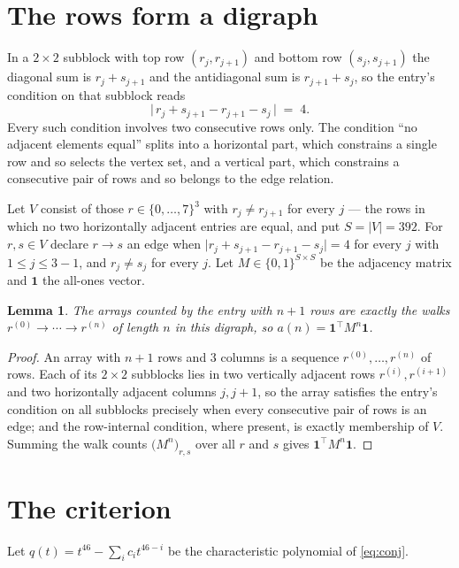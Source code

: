 \documentclass[11pt,a4paper]{article}
\theoremstyle{plain}
\newtheorem{lemma}[theorem]{Lemma}
\theoremstyle{definition}
\begin{document}
\section{The rows form a digraph}

In a $2\times2$ subblock with top row $(r_j,r_{j+1})$ and bottom row $(s_j,s_{j+1})$ the
diagonal sum is $r_j+s_{j+1}$ and the antidiagonal sum is $r_{j+1}+s_j$, so the entry's
condition on that subblock reads
\[
\bigl|\,r_j+s_{j+1}-r_{j+1}-s_j\,\bigr|\;=\;4.
\]
Every such condition involves two consecutive rows only. The condition ``no adjacent elements equal'' splits into a horizontal
part, which constrains a single row and so selects the vertex set, and a vertical part,
which constrains a consecutive pair of rows and so belongs to the edge relation.

Let $V$ consist of those $r\in\{0,\dots,7\}^{3}$ with $r_j\ne r_{j+1}$ for every
$j$ --- the rows in which no two horizontally adjacent entries are equal, and put $S=|V|=392$. For $r,s\in V$ declare $r\to s$ an edge
when $\bigl|r_j+s_{j+1}-r_{j+1}-s_j\bigr|=4$ for every $j$ with
$1\le j\le3-1$, and $r_j\ne s_j$ for every $j$. Let $M\in\{0,1\}^{S\times S}$ be the adjacency matrix and $\mathbf{1}$
the all-ones vector.

\begin{lemma}\label{lem:walk}
The arrays counted by the entry with $n+1$ rows are exactly the walks
$r^{(0)}\to\cdots\to r^{(n)}$ of length $n$ in this digraph, so
$a(n)=\mathbf{1}^{\!\top}M^{n}\mathbf{1}$.
\end{lemma}

\begin{proof}
An array with $n+1$ rows and $3$ columns is a sequence $r^{(0)},\dots,r^{(n)}$ of
rows. Each of its $2\times2$ subblocks lies in two vertically adjacent rows
$r^{(i)},r^{(i+1)}$ and two horizontally adjacent columns $j,j+1$, so the array satisfies
the entry's condition on all subblocks precisely when every consecutive pair of rows is an
edge; and the row-internal condition, where present, is exactly membership of $V$. Summing
the walk counts $\bigl(M^{n}\bigr)_{r,s}$ over all $r$ and $s$ gives
$\mathbf{1}^{\!\top}M^{n}\mathbf{1}$.
\end{proof}

\section{The criterion}

Let $q(t)=t^{46}-\sum_i c_i t^{46-i}$ be the characteristic polynomial of
\eqref{eq:conj}.
\end{document}
